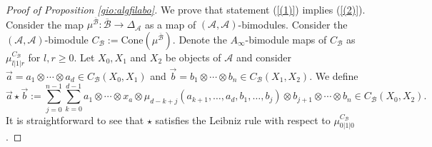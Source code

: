 \begin{proof}[Proof of Proposition \ref{gio:algfilabo}]
		
		
		We prove that statement (\ref{(1)}) implies (\ref{(2)}). Consider the map $\mu^{\overline{\mathcal{B}}}\colon \overline{\mathcal{B}}\to \Delta_\mathcal{A}$ as a map of $(\mathcal{A},\mathcal{A})$-bimodules. Consider the $(\mathcal{A},\mathcal{A})$-bimodule $C_\mathcal{B}:=\text{Cone}(\mu^{\overline{\mathcal{B}}})$. Denote the $A_\infty$-bimodule maps of $C_\mathcal{B}$ as $\mu^{C_\mathcal{B}}_{l|1|r}$ for $l,r\geq 0$.
		Let $X_0,X_1$ and $X_2$ be objects of $\mathcal{A}$ and consider $\vec{a}=a_1\otimes\cdots \otimes a_d\in C_\mathcal{B}(X_0,X_1)$ and $\vec{b}=b_1\otimes \cdots \otimes b_n\in C_\mathcal{B}(X_1,X_2)$. We define $$\vec{a}\star \vec{b}:= \sum_{j=0}^{n-1}\sum_{k=0}^{d-1}a_1\otimes \cdots \otimes x_{a}\otimes \mu_{d-k+j}(a_{k+1},\ldots, a_d,b_1,\ldots, b_j)\otimes b_{j+1}\otimes \cdots \otimes b_n\in C_\mathcal{B}(X_0,X_2).$$ It is straightforward to see that $\star$ satisfies the Leibniz rule with respect to $\mu^{C_\mathcal{B}}_{0|1|0}$.


\end{proof}
